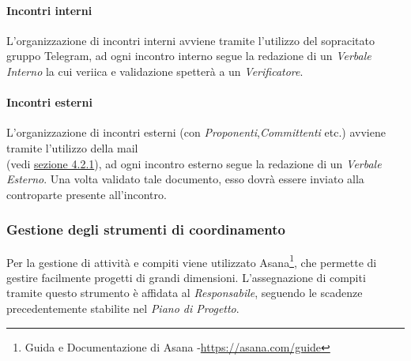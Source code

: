 \paragraph{Incontri interni} L'organizzazione di incontri interni avviene tramite l'utilizzo del sopracitato gruppo Telegram, ad ogni incontro interno segue la redazione di un \textit{Verbale Interno} la cui veriica e validazione spetterà a un \textit{Verificatore}.
\paragraph{Incontri esterni}\label{Com esterne} L'organizzazione di incontri esterni (con \textit{Proponenti},\textit{Committenti} etc.) avviene tramite l'utilizzo della mail \\ \mailzeroseven (vedi \hyperref[Com esterne]{sezione 4.2.1}), ad ogni incontro esterno segue la redazione di un \textit{Verbale Esterno}. Una volta validato tale documento, esso dovrà essere inviato alla controparte presente all'incontro.

\subsubsection{Gestione degli strumenti di coordinamento} Per la gestione di attività e compiti viene utilizzato Asana\footnote{Guida e Documentazione di Asana -\url{https://asana.com/guide}}, che permette di gestire facilmente progetti di grandi dimensioni.
L'assegnazione di compiti tramite questo strumento è affidata al \textit{Responsabile}, seguendo le scadenze precedentemente stabilite nel \textit{Piano di Progetto}.